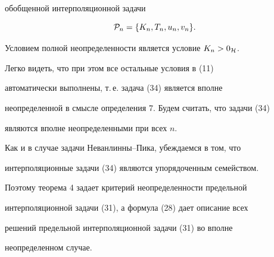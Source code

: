 \begin{exam}
обобщенной интерполяционной задачи


\begin{equation}


{\cal P}_n = \{ K_n,T_n,u_n,v_n \}.


\end{equation}


Условием полной неопределенности является условие $ K_n>0_{\cal H}$.


Легко видеть, что при этом все остальные условия в (11)


автоматически выполнены, т.\,е. задача (34) является вполне


неопределенной в смысле определения 7. Будем считать, что задачи (34)


являются вполне неопределенными при всех $n$.





Как и в случае задачи Неванлинны--Пика, убеждаемся в том, что


интерполяционные задачи (34) являются упорядоченным семейством.


Поэтому теорема 4 задает критерий неопределенности предельной


интерполяционной задачи (31), а формула (28) дает описание всех


решений предельной интерполяционной задачи (31) во вполне


неопределенном случае.


\end{exam}








